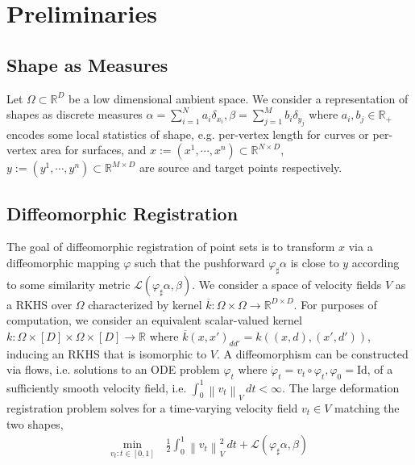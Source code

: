 \documentclass{6838publ}
\newcommand\sL{\ensuremath{\mathcal{L}}}
\newcommand\R{\ensuremath{\mathbb{R}}} %
\newcommand{\norm}[1]{\left\lVert#1\right\rVert}
\begin{document}


\section{Preliminaries}\label{sec:preliminaries}


\subsection{Shape as Measures}

Let $\Omega \subset\R^D$ be a low dimensional ambient space. We consider a representation of shapes as discrete measures $\alpha = \sum_{i=1}^N a_i \delta_{x_i}, \beta = \sum_{j=1}^M b_i \delta_{y_j}$ where $a_i,b_j\in\R_+$ encodes some local statistics of shape, e.g. per-vertex length for curves or per-vertex area for surfaces, and $x := (x^1,\cdots,x^n)\subset \R^{N\times D}$, $y := (y^1,\cdots,y^n)\subset\R^{M\times D}$ are source and target points respectively. 


\subsection{Diffeomorphic Registration}


The goal of diffeomorphic registration of point sets is to transform $x$ via a diffeomorphic mapping $\varphi$ such that the pushforward $\varphi_\sharp \alpha$ is close to $y$ according to some similarity metric $\sL(\varphi_\sharp \alpha, \beta)$. We consider a space of velocity fields $V$ as a RKHS over $\Omega$ characterized by kernel $\overline{k}:\Omega\times\Omega\to\R^{D\times D}$. For purposes of computation, we consider an equivalent scalar-valued kernel $k:\Omega\times[D]\times\Omega\times[D] \to\R$ where $\overline{k}(x,x')_{dd'} = k((x,d),(x',d'))$, inducing an RKHS that is isomorphic to $V$. A diffeomorphism can be constructed via flows, i.e. solutions to an ODE problem $\varphi_t$ where $\dot{\varphi}_t = v_t\circ \varphi_t, \varphi_0 = \text{Id}$, of a sufficiently smooth velocity field, i.e. $\int_0^1 \norm{v_t}_V\, dt<\infty$. The large deformation registration problem solves for a time-varying velocity field $v_t\in V$ matching the two shapes,
\begin{align}
    \min_{v_t:t\in [0,1]} \,
        &\frac{1}{2} \int_0^1 \norm{v_t}_V^2 \, dt + \sL(\varphi_\sharp \alpha, \beta)
\end{align}
\end{document}
